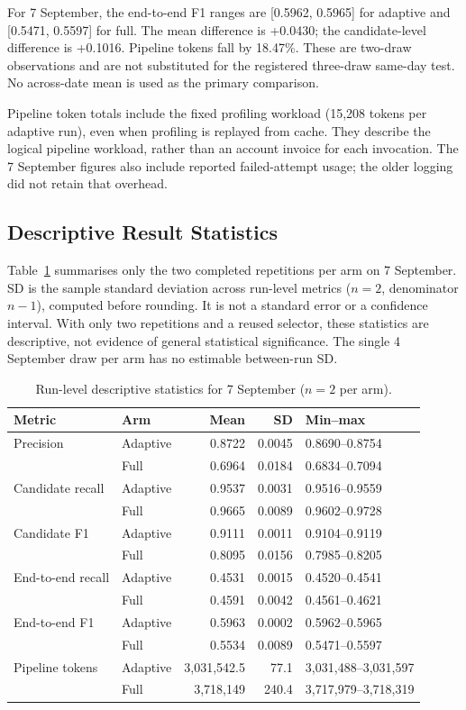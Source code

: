 \documentclass[11pt]{article}
\begin{document}
For 7 September, the end-to-end F1 ranges are [0.5962, 0.5965] for adaptive and
[0.5471, 0.5597] for full. The mean difference is +0.0430; the candidate-level
difference is +0.1016. Pipeline tokens fall by 18.47\%. These are two-draw
observations and are not substituted for the registered three-draw same-day test.
No across-date mean is used as the primary comparison.

Pipeline token totals include the fixed profiling workload (15,208 tokens per
adaptive run), even when profiling is replayed from cache. They describe the
logical pipeline workload, rather than an account invoice for each invocation.
The 7 September figures also include reported failed-attempt usage; the older
logging did not retain that overhead.

\subsection{Descriptive Result Statistics}
Table~\ref{tab:stats} summarises only the two completed repetitions per arm
on 7 September. SD is the sample standard deviation across run-level metrics
($n=2$, denominator $n-1$), computed before rounding. It is not a standard error
or a confidence interval. With only two repetitions and a reused selector,
these statistics are descriptive, not evidence of general statistical significance.
The single 4 September draw per arm has no estimable between-run SD.

\begin{table}[H]
\centering\small
\setlength{\tabcolsep}{4pt}
\begin{tabular}{llrrl}
\toprule
Metric & Arm & Mean & SD & Min--max \\
\midrule
Precision & Adaptive & 0.8722 & 0.0045 & 0.8690--0.8754 \\
 & Full & 0.6964 & 0.0184 & 0.6834--0.7094 \\
Candidate recall & Adaptive & 0.9537 & 0.0031 & 0.9516--0.9559 \\
 & Full & 0.9665 & 0.0089 & 0.9602--0.9728 \\
Candidate F1 & Adaptive & 0.9111 & 0.0011 & 0.9104--0.9119 \\
 & Full & 0.8095 & 0.0156 & 0.7985--0.8205 \\
End-to-end recall & Adaptive & 0.4531 & 0.0015 & 0.4520--0.4541 \\
 & Full & 0.4591 & 0.0042 & 0.4561--0.4621 \\
End-to-end F1 & Adaptive & 0.5963 & 0.0002 & 0.5962--0.5965 \\
 & Full & 0.5534 & 0.0089 & 0.5471--0.5597 \\
Pipeline tokens & Adaptive & 3,031,542.5 & 77.1 & 3,031,488--3,031,597 \\
 & Full & 3,718,149 & 240.4 & 3,717,979--3,718,319 \\
\bottomrule
\end{tabular}
\caption{Run-level descriptive statistics for 7 September ($n=2$ per arm).}
\label{tab:stats}
\end{table}
\end{document}
